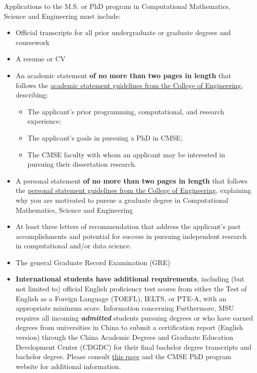 Applications to the M.S. or PhD program in Computational Mathematics, Science and
Engineering must include:

\begin{itemize}
\item Official transcripts for all prior undergraduate or graduate
  degrees and coursework
\item A resume or CV
\item An academic statement \textbf{of no more than two pages in
    length} that follows the
  \href{http://www.egr.msu.edu/academics/graduate/academic-personal-statements-guidelines/#academic}{academic
    statement
    guidelines from the College of Engineering}, 
  describing:  

\begin{itemize}
  \item The applicant's prior programming, computational, and research experience;  
  \item The applicant's goals in pursuing a PhD in CMSE;  
  \item  The CMSE faculty with whom an applicant may be interested in
    pursuing their dissertation research.  
\end{itemize}

\item A personal statement \textbf{of no more than two pages in
    length} that follows the
  \href{http://www.egr.msu.edu/academics/graduate/academic-personal-statements-guidelines/#personal}{personal
    statement
    guidelines from the College of Engineering}, explaining
why you are motivated to pursue
  a graduate degree in Computational Mathematics, Science and Engineering

\item At least three letters of recommendation that address the
  applicant's past accomplishments and potential for success in
  pursuing independent research in computational and/or data science.

\item The general Graduate Record Examination (GRE)

\item \textbf{International students have additional requirements},
  including (but not limited to) official English proficiency test
  scores from either the Test of English as a Foreign Language
  (TOEFL), IELTS, or PTE-A, with an appropriate minimum score. Information concerning 
  Furthermore, MSU requires all incoming \textbf{\textit{admitted}}
  students pursuing degrees or who have earned degrees from
  universities in China to submit a certification report (English
  version) through the China Academic Degrees and Graduate Education
  Development Center (CDGDC) for their final bachelor degree
  transcripts and bachelor degree.  Please consult
  \href{https://grad.msu.edu/internationalapplicants}{this page} and
  the CMSE PhD program website for additional information.


\end{itemize}


